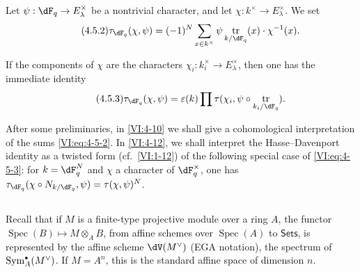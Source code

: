 \documentclass[12pt,oneside,english]{smfbook}
\DeclareMathOperator{\spec}{Spec}
\DeclareMathOperator{\tr}{tr}
\newcounter{char}
\let\oldbullet\bullet
\renewcommand{\bullet}{\textnormal{\tiny$\oldbullet$}}
\begin{document}
Let $\psi:\dF_q\to E_\lambda^\times$ be a nontrivial character, and let $\chi:k^\times\to E_\lambda^\times$. We set
\begin{equation*}\tag{4.5.2}\label{VI:eq:4-5-2}
  \tau_{\dF_q}(\chi,\psi) = (-1)^N \sum_{x\in k^\times} \psi \tr_{k/\dF_q}(x) \cdot \chi^{-1}(x) \text{.}
\end{equation*}

If the components of $\chi$ are the characters $\chi_i:k_i^\times\to E_\lambda^\times$, then one has the immediate identity
\begin{equation*}\tag{4.5.3}\label{VI:eq:4-5-3}
  \tau_{\dF_q}(\chi,\psi) = \varepsilon(k) \prod \tau(\chi_i,\psi\circ \tr_{k_i/\dF_q}) \text{.}
\end{equation*}

After some preliminaries, in \ref{VI:4-10} we shall give a cohomological interpretation of the sums \eqref{VI:eq:4-5-2}. In \ref{VI:4-12}, we shall interpret the Hasse--Davenport identity as a twisted form (cf.\ \ref{VI:1-12}) of the following special case of \eqref{VI:eq:4-5-3}: for $k=\dF_q^N$ and $\chi$ a character of $\dF_q^\times$, one has $\tau_{\dF_q}(\chi\circ N_{k/\dF_q},\psi)=\tau(\chi,\psi)^N$.

\subsection{}\label{VI:4-6}

Recall that if $M$ is a finite-type projective module over a ring $A$, the functor $\spec(B)\mapsto M\otimes_A B$, from affine schemes over $\spec(A)$ to $\mathsf{Sets}$, is represented by the affine scheme $\dV(M^\vee)$ (EGA notation), the spectrum of $\operatorname{Sym}_A^\bullet(M^\vee)$. If $M=A^n$, this is the standard affine space of dimension $n$.
\end{document}
